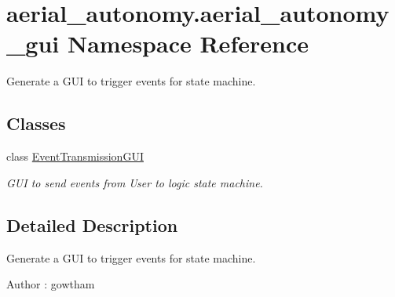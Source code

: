 \hypertarget{namespaceaerial__autonomy_1_1aerial__autonomy__gui}{\section{aerial\-\_\-autonomy.\-aerial\-\_\-autonomy\-\_\-gui Namespace Reference}
\label{namespaceaerial__autonomy_1_1aerial__autonomy__gui}
}


Generate a G\-U\-I to trigger events for state machine.  


\subsection*{Classes}
\begin{DoxyCompactItemize}
\item 
class \hyperlink{classaerial__autonomy_1_1aerial__autonomy__gui_1_1EventTransmissionGUI}{Event\-Transmission\-G\-U\-I}
\begin{DoxyCompactList}\small\item\em G\-U\-I to send events from User to logic state machine. \end{DoxyCompactList}\end{DoxyCompactItemize}


\subsection{Detailed Description}
Generate a G\-U\-I to trigger events for state machine. \begin{DoxyAuthor}{Author}
\-: gowtham 
\end{DoxyAuthor}
